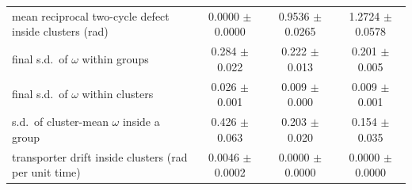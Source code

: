 \begin{tabular}{@{}lccc@{}}
mean reciprocal two-cycle defect inside clusters (rad) & 0.0000 $\pm$ 0.0000 & 0.9536 $\pm$ 0.0265 & 1.2724 $\pm$ 0.0578 \\
final s.d.\ of $\omega$ within groups & 0.284 $\pm$ 0.022 & 0.222 $\pm$ 0.013 & 0.201 $\pm$ 0.005 \\
final s.d.\ of $\omega$ within clusters & 0.026 $\pm$ 0.001 & 0.009 $\pm$ 0.000 & 0.009 $\pm$ 0.001 \\
s.d.\ of cluster-mean $\omega$ inside a group & 0.426 $\pm$ 0.063 & 0.203 $\pm$ 0.020 & 0.154 $\pm$ 0.035 \\
transporter drift inside clusters (rad per unit time) & 0.0046 $\pm$ 0.0002 & 0.0000 $\pm$ 0.0000 & 0.0000 $\pm$ 0.0000 \\
\bottomrule
\end{tabular}
